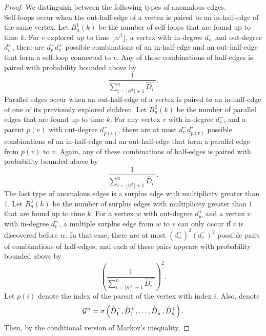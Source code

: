 \begin{proof}
We distinguish between the following types of anomalous edges.\\
Self-loops occur when the out-half-edge of a vertex is paired to an in-half-edge of the same vertex.  Let $B^1_n(k)$ be the number of self-loops that are found up to time $k$. For $v$ explored up to time $\lfloor n^\beta\rfloor$, a vertex with in-degree $d^-_v$ and out-degree $d^+_v$, there are $d^-_v d^+_v$ possible combinations of an in-half-edge and an out-half-edge that form a self-loop connected to $v$. Any of these combinations of half-edges is paired with probability bounded above by 
$$\frac{1}{\sum_{i=\lfloor n^\beta \rfloor+1}^n\hat{D}^-_i}.$$
Parallel edges occur when an out-half-edge of a vertex is paired to an in-half-edge of one of its previously explored children. Let $B^2_n(k)$ be the number of parallel edges that are found up to time $k$. For any vertex $v$ with in-degree $d^-_v$, and a parent $p(v)$ with out-degree $d^+_{p(v)}$, there are at most $d^-_v d^+_{p(v)}$ possible combinations of an in-half-edge and an out-half-edge that form a parallel edge from $p(v)$ to $v$. Again, any of these combinations of half-edges is paired with probability bounded above by 
$$\frac{1}{\sum_{i=\lfloor n^\beta \rfloor+1}^n \hat{D}^-_i}.$$
The last type of anomalous edges is a surplus edge with multiplicity greater than 1. Let $B^3_n(k)$ be the number of surplus edges with multiplicity greater than 1 that are found up to time $k$. For a vertex $w$ with out-degree $d^+_w$ and a vertex $v$ with in-degree $d^-_v$, a multiple surplus edge from $w$ to $v$ can only occur if $v$ is discovered before $w$. In that case, there are at most $(d^+_w)^2(d^-_v)^2$ possible pairs of combinations of half-edges, and each of these pairs appears with probability bounded above by
$$\left(\frac{1}{\sum_{i=\lfloor n^\beta \rfloor+1}^n \hat{D}^-_i}\right)^2.$$
Let $p(i)$ denote the index of the parent of the vertex with index $i$. Also, denote $${\mathcal G}^n=\sigma\left(\hat{D}^-_1,\hat{D}^+_1,\dots,\hat{D}^-_n,\hat{D}^+_n \right).$$ Then, by the conditional version of Markov's inequality, 


\end{proof}

